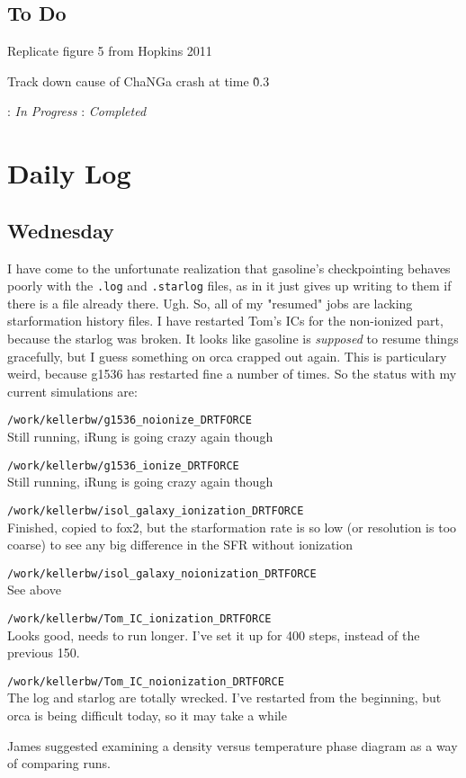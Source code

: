 \documentclass[11pt,letterpaper]{article}
\begin{document}
\subsection*{To Do}
\begin{bullets}
\item[\textleaf] Replicate figure 5 from Hopkins 2011
\item Track down cause of ChaNGa crash at time \~0.3
\end{bullets}

\textleaf : \textit{In Progress} \qquad \checkmark : \textit{Completed}

\section*{Daily Log}
\subsection*{Wednesday}
I have come to the unfortunate realization that gasoline's checkpointing behaves
poorly with the \verb!.log! and \verb!.starlog! files, as in it just gives up
writing to them if there is a file already there.  Ugh.  So, all of my "resumed"
jobs are lacking starformation history files.  I have restarted Tom's ICs for
the non-ionized part, because the starlog was broken.  It looks like gasoline is
\textit{supposed} to resume things gracefully, but I guess something on orca
crapped out again.  This is particulary weird, because g1536 has restarted fine
a number of times. So the status with my current simulations are:
\begin{description}
\item{\verb!/work/kellerbw/g1536_noionize_DRTFORCE!}\\ Still running, iRung is
going crazy again though
\item{\verb!/work/kellerbw/g1536_ionize_DRTFORCE!}\\ Still running, iRung
is going crazy again though
\item{\verb!/work/kellerbw/isol_galaxy_ionization_DRTFORCE!\checkmark}\\ 
Finished, copied to fox2, but the starformation rate is so low (or resolution 
is too coarse) to see any big difference in the SFR without ionization
\item{\verb!/work/kellerbw/isol_galaxy_noionization_DRTFORCE!\checkmark}\\ See
above 
\item{\verb!/work/kellerbw/Tom_IC_ionization_DRTFORCE!\checkmark}\\ Looks good,
needs to run longer.  I've set it up for 400 steps, instead of the previous 150.
\item{\verb!/work/kellerbw/Tom_IC_noionization_DRTFORCE!}\\ The log and starlog
are totally wrecked.  I've restarted from the beginning, but orca is being 
difficult today, so it may take a while
\end{description}
James suggested examining a density versus temperature phase diagram as a way 
of comparing runs.
\end{document}
